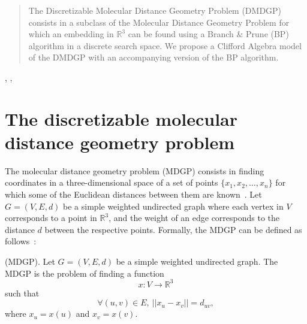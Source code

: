 \documentclass{proc}
\begin{document}

\author{Alessandro Andrioni}





\begin{abstract}
The Discretizable Molecular Distance Geometry Problem (DMDGP) consists in a subclass of the Molecular Distance Geometry Problem for which an embedding in ${\mathbb{R}^3}$ can be found using a Branch \& Prune (BP) algorithm in a discrete search space. We propose a Clifford Algebra model of the DMDGP with an accompanying version of the BP algorithm.
\end{abstract}

\begin{keywords}
, , 
\end{keywords}

\section{The discretizable molecular distance geometry problem}
\label{dmdgp}
The molecular distance geometry problem (MDGP) consists in finding coordinates in a three-dimensional space of a set of points $\{x_1, x_2, \dots, x_n \}$ for which some of the Euclidean distances between them are known~\cite{crippen}. Let $G = (V, E, d)$ be a simple weighted undirected graph where each vertex in $V$ corresponds to a point in $\mathbb{R}^3$, and the weight of an edge corresponds to the distance $d$ between the respective points. Formally, the MDGP can be defined as follows~\cite{dmdgp}:
\begin{definition}
(MDGP). Let $G = (V, E, d)$ be a simple weighted undirected graph. The MDGP is the problem of finding a function
\[ x : V \to \mathbb{R}^3 \]
such that
\[ \forall (u,v) \in E, \ ||x_u-x_v|| = d_{uv}, \]
where $x_u = x(u)$ and $x_v = x(v)$.
\end{definition}
\end{document}
